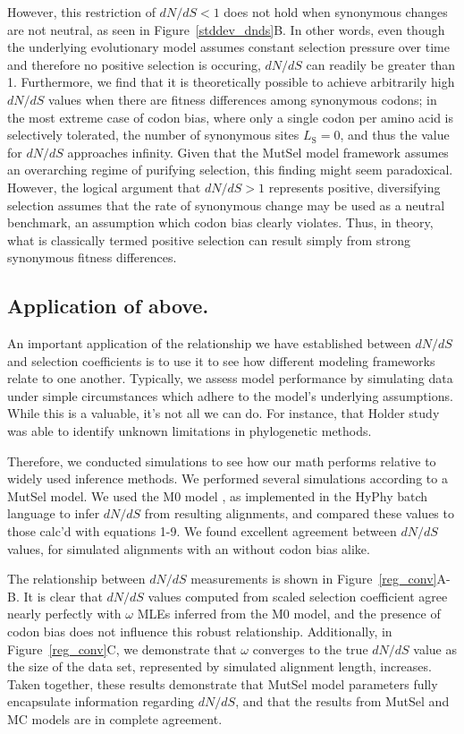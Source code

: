 \documentclass{pnastwo}
\begin{document}
\begin{article}
However, this restriction of $dN/dS < 1$ does not hold when synonymous changes are not neutral, as seen in Figure~\ref{stddev_dnds}B. In other words, even though the underlying evolutionary model assumes constant selection pressure over time and therefore no positive selection is occuring, $dN/dS$ can readily be greater than 1. Furthermore, we find that it is theoretically possible to achieve arbitrarily high $dN/dS$ values when there are fitness differences among synonymous codons; in the most extreme case of codon bias, where only a single codon per amino acid is selectively tolerated, the number of synonymous sites $L_\text{S} = 0$, and thus the value for $dN/dS$ approaches infinity. Given that the MutSel model framework assumes an overarching regime of purifying selection, this finding might seem paradoxical. However, the logical argument that $dN/dS > 1$ represents positive, diversifying selection assumes that the rate of synonymous change may be used as a neutral benchmark, an assumption which codon bias clearly violates. Thus, in theory, what is classically termed positive selection can result simply from strong synonymous fitness differences. 	
		
		

\subsection*{Application of above.}

An important application of the relationship we have established between $dN/dS$ and selection coefficients is to use it to see how different modeling frameworks relate to one another. Typically, we assess model performance by simulating data under simple circumstances which adhere to the model's underlying assumptions. While this is a valuable, it's not all we can do. For instance, that Holder study was able to identify unknown limitations in phylogenetic methods. 

Therefore, we conducted simulations to see how our math performs relative to widely used inference methods.
We performed several simulations according to a MutSel model. We used the M0 model \cite{NielsenYang1998}, as implemented in the HyPhy batch language \cite{KosakovskyPondetal2005} to infer $dN/dS$ from resulting alignments, and compared these values to those calc'd with equations 1-9. We found excellent agreement between $dN/dS$ values, for simulated alignments with an without codon bias alike.

The relationship between $dN/dS$ measurements is shown in Figure~\ref{reg_conv}A-B. It is clear that $dN/dS$ values computed from scaled selection coefficient agree nearly perfectly with $\omega$ MLEs inferred from the M0 model, and the presence of codon bias does not influence this robust relationship. Additionally, in Figure~\ref{reg_conv}C, we demonstrate that $\omega$ converges to the true $dN/dS$ value as the size of the data set, represented by simulated alignment length, increases. Taken together, these results demonstrate that MutSel model parameters fully encapsulate information regarding $dN/dS$, and that the results from MutSel and MC models are in complete agreement.


\end{article}
\end{document}

